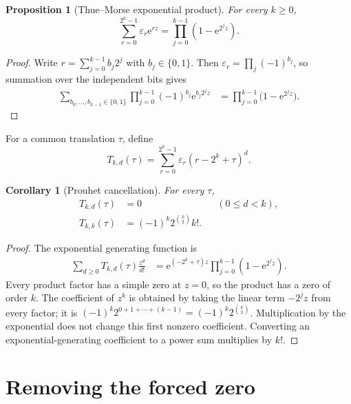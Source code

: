 \documentclass[11pt,oneside,openany]{book}
\newtheorem{proposition}[theorem]{Proposition}
\newtheorem{corollary}[theorem]{Corollary}
\theoremstyle{definition}
\theoremstyle{remark}
\newcommand{\e}{\mathrm e}
\begin{document}
\begin{proposition}[Thue--Morse exponential product]\label{prop:fab-tm-product}
For every $k\ge0$,
\begin{equation}
 \sum_{r=0}^{2^k-1}\varepsilon_r\e^{rz}
 =\prod_{j=0}^{k-1}(1-\e^{2^jz}).
 \label{eq:fab-tm-product}
\end{equation}
\end{proposition}

\begin{proof}
Write $r=\sum_{j=0}^{k-1}b_j2^j$ with $b_j\in\{0,1\}$.  Then
\(
 \varepsilon_r=\prod_j(-1)^{b_j}
\), so summation over the independent bits gives
\begin{align*}
 \sum_{b_0,\ldots,b_{k-1}\in\{0,1\}}
 \prod_{j=0}^{k-1}(-1)^{b_j}\e^{b_j2^jz}
 &=\prod_{j=0}^{k-1}\bigl(1-\e^{2^jz}\bigr).
\end{align*}
\end{proof}

For a common translation $\tau$, define
\begin{equation}
 T_{k,d}(\tau)=\sum_{r=0}^{2^k-1}\varepsilon_r
 (r-2^k+\tau)^d.
 \label{eq:fab-Tkd}
\end{equation}

\begin{corollary}[Prouhet cancellation]\label{cor:fab-prouhet}
For every $\tau$,
\begin{align}
 T_{k,d}(\tau)&=0 &&(0\le d<k),\label{eq:fab-prouhet-zero}\\
 T_{k,k}(\tau)&=(-1)^k2^{\binom k2}k!.
 \label{eq:fab-prouhet-leading}
\end{align}
\end{corollary}

\begin{proof}
The exponential generating function is
\begin{align*}
 \sum_{d\ge0}T_{k,d}(\tau)\frac{z^d}{d!}
 &=\e^{(-2^k+\tau)z}\prod_{j=0}^{k-1}(1-\e^{2^jz}).
\end{align*}
Every product factor has a simple zero at $z=0$, so the product has a zero of order $k$.  The coefficient of $z^k$ is obtained by taking the linear term $-2^jz$ from every factor; it is
\(
 (-1)^k2^{0+1+\cdots+(k-1)}=(-1)^k2^{\binom k2}
\).
Multiplication by the exponential does not change this first nonzero coefficient.  Converting an exponential-generating coefficient to a power sum multiplies by $k!$.
\end{proof}

\section{Removing the forced zero}
\end{document}
